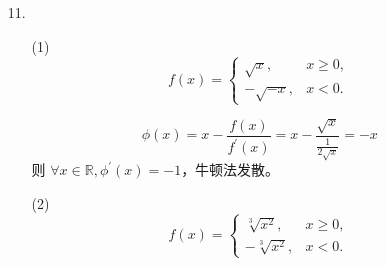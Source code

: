 \documentclass{sjtuarticle}
\begin{document}
\begin{itemize}
\begin{proof}
        对原迭代公式两侧同减去 $x_k$，有
        \begin{equation*}
            x_{k+1}-x_k=\frac{1}{2}\left(\frac{a}{x_k}-x_k\right)=\frac{1}{2}\cdot\frac{a-x_k^2}{x_k}\leq 0
        \end{equation*}
        也就是序列 $x_1,x_2,\cdots$ 是单调递减的。
    \end{proof}
    \item[11.] \begin{solution}
        \begin{itemize}
            \item[(1)] \begin{equation*}
                f(x)=\begin{cases}
                    \sqrt{x},&x\geq 0,\\
                    -\sqrt{-x},&x<0.
                \end{cases}
            \end{equation*}

            \begin{equation*}
                \phi(x)=x-\frac{f(x)}{f^\prime(x)}=x-\frac{\sqrt{x}}{\frac{1}{2\sqrt{x}}}=-x
            \end{equation*}    
            则 $\forall x\in \mathbb{R}, \phi^\prime(x)=-1$，牛顿法发散。
            \item[(2)] \begin{equation*}
                f(x)=\begin{cases}
                    \sqrt[3]{x^2},&x\geq 0,\\
                    -\sqrt[3]{x^2},&x<0.
                \end{cases}
            \end{equation*}


\end{itemize}
\end{solution}
\end{itemize}
\end{document}
